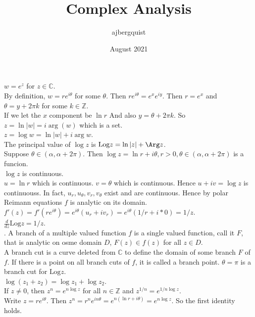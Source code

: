 \documentclass{article}
\title{Complex Analysis}
\author{ajbergquist }
\date{August 2021}
\theoremstyle{definition}
\newcommand{\deriv}{\frac{d}{dz}}
\newcommand{\Log}{\mbox{Log}}
\newcommand{\Z}{\mathbb{Z}}
\newcommand{\C}{\mathbb{C}}
\begin{document}
 
 $w = e^z$ for $z\in \C$.\\

 By definition, $w = re^{i\theta}$ for some $\theta$. Then $re^{i\theta} = e^xe^{iy}$. Then $r = e^x$ and $\theta = y + 2\pi k$ for some $k\in \Z$.\\

If we let the $x$ component be $\ln r$ And also $y = \theta + 2\pi k$. So $z = \ln|w| = i\arg(w)$ which is a set.\\ 
$z = \log w = \ln |w| + i\arg w$.\\

 The principal value of $\log z$ is $\Log z = \ln |z| + \Arg z$.\\

 Suppose $\theta \in (\alpha,\alpha + 2\pi)$. Then $\log z = \ln r + i\theta, r> 0, \theta \in (\alpha,\alpha+2\pi)$ is a funcion.\\

 $\log z$ is continuous.\\
 $u = \ln r$ which is continuous. $v = \theta$ which is continuous. Hence $u + iv = \log z$ is continuouss. In fact, $u_r,u_{\theta}, v_r, v_{\theta}$ exist and are continuous. Hence by polar Reimann equations $f$ is analytic on its domain.\\

 $f'(z) = f'(re^{i\theta}) = e^{i\theta}(u_r+iv_r) = e^{i\theta}(1/r + i*0) = 1/z$.\\

 $\deriv \Log z = 1/z$.\\

. A branch of a multiple valued function $f$ is a single valued function, call it $F$, that is analytic on osme domain $D$, $F(z)\in f(z)$ for all $z\in D$. \\

 A branch cut is a curve deleted from $\C$ to define the domain of some branch $F$ of $f$. If there is a point on all branch cuts of $f$, it is called a branch point. $\theta = \pi$ is a branch cut for $\Log z$.\\

 $\log(z_1 + z_2) = \log z_1 + \log z_2$.\\

 If $z \ne 0$, then $z^n = e^{n\log z}$ for all $n\in \Z$ and $z^{1/n} = e^{1/n \log z}$.\\
 Write $z=re^{i\theta}$. Then $z^n = r^n e^{in\theta} = e^{n(\ln r + i\theta)} = e^{n\log z}$. So the first identity holds.
\end{document}
